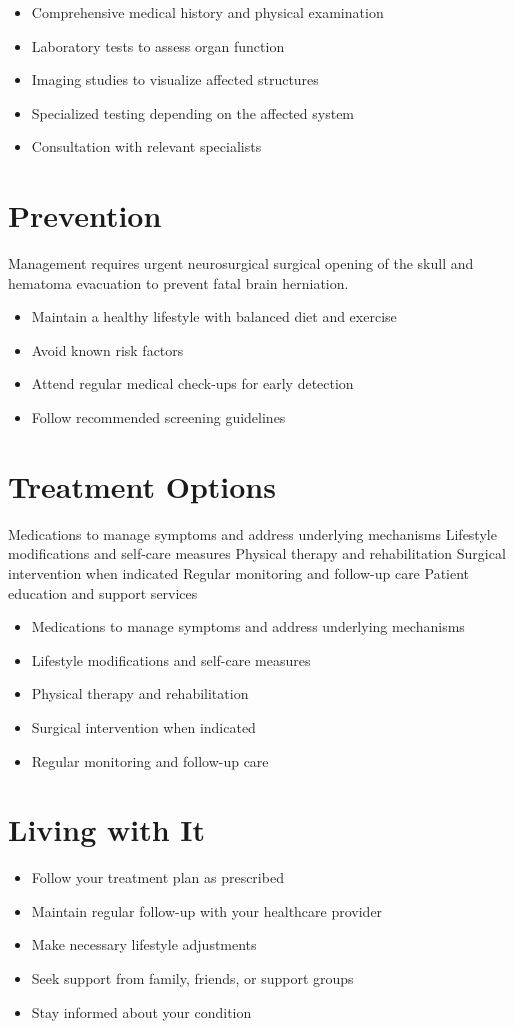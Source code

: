 \begin{itemize}[noitemsep]
  \item Comprehensive medical history and physical examination
  \item Laboratory tests to assess organ function
  \item Imaging studies to visualize affected structures
  \item Specialized testing depending on the affected system
  \item Consultation with relevant specialists
\end{itemize}
\section{Prevention}
Management requires urgent neurosurgical surgical opening of the skull and hematoma evacuation to prevent fatal brain herniation.

\begin{itemize}[noitemsep]
  \item Maintain a healthy lifestyle with balanced diet and exercise
  \item Avoid known risk factors
  \item Attend regular medical check-ups for early detection
  \item Follow recommended screening guidelines
\end{itemize}
\section{Treatment Options}
Medications to manage symptoms and address underlying mechanisms Lifestyle modifications and self-care measures Physical therapy and rehabilitation Surgical intervention when indicated Regular monitoring and follow-up care Patient education and support services

\begin{itemize}[noitemsep]
  \item Medications to manage symptoms and address underlying mechanisms
  \item Lifestyle modifications and self-care measures
  \item Physical therapy and rehabilitation
  \item Surgical intervention when indicated
  \item Regular monitoring and follow-up care
\end{itemize}
\section{Living with It}
\begin{itemize}[noitemsep]
  \item Follow your treatment plan as prescribed
  \item Maintain regular follow-up with your healthcare provider
  \item Make necessary lifestyle adjustments
  \item Seek support from family, friends, or support groups
  \item Stay informed about your condition
\end{itemize}
